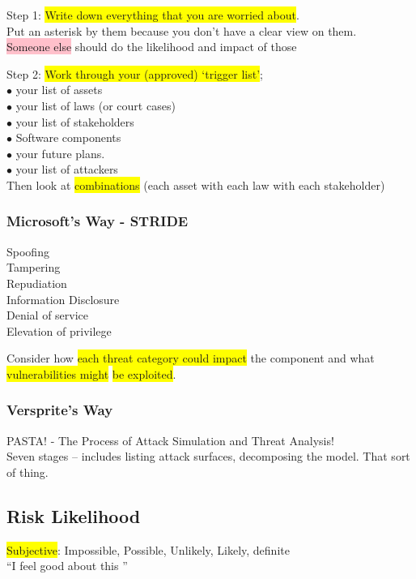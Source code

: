 \documentclass[tikz,border=10pt]{project_plan}
\newcommand{\bulletPoint}{\hspace{-3.1pt}$\bullet$ \hspace{5pt}}
\begin{document}
Step 1: \colorbox{yellow}{Write down everything that you are worried about}.\\
Put an asterisk by them because you don’t have a clear view on them.\\
\colorbox{pink}{Someone else} should do the likelihood and impact of those

Step 2: \colorbox{yellow}{Work through your (approved) ‘trigger list’};\\
\bulletPoint your list of assets \\
\bulletPoint your list of laws (or court cases) \\
\bulletPoint your list of stakeholders \\
\bulletPoint Software components \\
\bulletPoint your future plans.\\
\bulletPoint your list of attackers\\
Then look at \colorbox{yellow}{combinations} (each asset with each law with each stakeholder)

\subsubsection{Microsoft's Way - STRIDE}

Spoofing \\
Tampering\\
Repudiation\\
Information Disclosure \\
Denial of service\\
Elevation of privilege

Consider how \colorbox{yellow}{each threat category could impact} the component and what \colorbox{yellow}{vulnerabilities might} \colorbox{yellow}{be exploited}.

\subsubsection{Versprite’s Way}

PASTA! - The Process of Attack Simulation and Threat Analysis!\\
Seven stages – includes listing attack surfaces, decomposing the model. That sort of thing.

\subsection{Risk Likelihood}

\colorbox{yellow}{Subjective}: Impossible, Possible, Unlikely, Likely, definite\\
“I feel good about this ”
\end{document}
